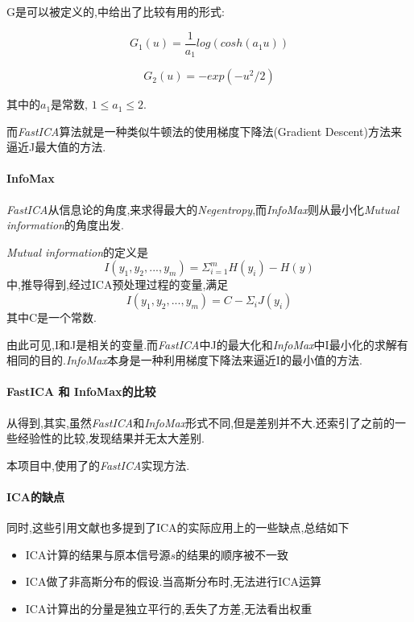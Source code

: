 	G是可以被定义的,\cite{hyvarinen2000independent}中给出了比较有用的形式:
	\begin{multicols}{2}
		\begin{equation}
			G_1(u) = \frac{1}{a_1}log(cosh(a_1u))
		\end{equation}
	
		\begin{equation}
			G_2(u) = -exp(-u^2/2)
		\end{equation}
	\end{multicols}
	其中的$a_1$是常数, $1 \leqslant a_1 \leqslant 2$.\newline


	而\textit{FastICA}算法就是一种类似牛顿法的使用梯度下降法(Gradient Descent)方法来逼近J最大值的方法. 
	
	\paragraph{InfoMax}
	\textit{FastICA}从信息论的角度,来求得最大的\textit{Negentropy},而\textit{InfoMax}则从最小化\textit{Mutual information}的角度出发.
	
	\textit{Mutual information}的定义是
	\begin{equation}
		I(y_1,y_2,...,y_m) = \Sigma_{i=1}^m H(y_i) - H(y)
	\end{equation}
	\cite{hyvarinen2000independent}中,推导得到,经过ICA预处理过程的变量,满足\begin{equation}
			I(y_1,y_2,...,y_m) = C - \Sigma_iJ(y_i)
		\end{equation}
		其中C是一个常数.
		
		由此可见,I和J是相关的变量.而\textit{FastICA}中J的最大化和\textit{InfoMax}中I最小化的求解有相同的目的.\textit{InfoMax}本身是一种利用梯度下降法来逼近I的最小值的方法.
	
	\paragraph{FastICA 和 InfoMax的比较}
	从\cite{draper2003recognizing}得到,其实,虽然\textit{FastICA}和\textit{InfoMax}形式不同,但是差别并不大.\cite{draper2003recognizing}还索引了之前的一些经验性的比较,发现结果并无太大差别.\newline
	
	本项目中,使用了\cite{fastica25}的\textit{FastICA}实现方法.	
	\paragraph{ICA的缺点} 同时,这些引用文献也多提到了ICA的实际应用上的一些缺点,总结如下
	\begin{itemize}
		\item ICA计算的结果与原本信号源$s$的结果的顺序被不一致
		\item ICA做了非高斯分布的假设.当高斯分布时,无法进行ICA运算
		\item ICA计算出的分量是独立平行的,丢失了方差,无法看出权重
	\end{itemize}

